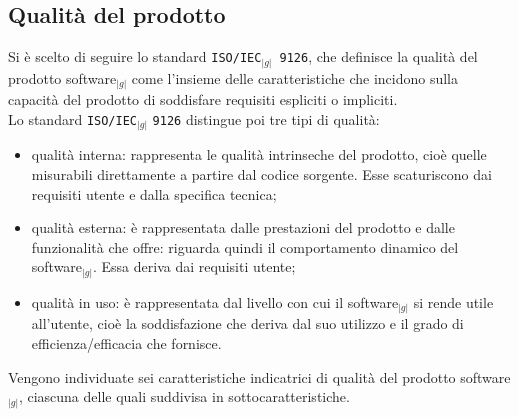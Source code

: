     \subsection{Qualità del prodotto}{
    \label{sec:Qualita2}
	Si è scelto di seguire lo standard \texttt{ISO/IEC$_{|g|}$ 9126}, che definisce la qualità del prodotto software$_{|g|}$ come l’insieme delle 
	caratteristiche che incidono sulla capacità del prodotto di soddisfare requisiti espliciti o impliciti.\\
	Lo standard \texttt{ISO/IEC}$_{|g|}$ \texttt{9126} distingue poi tre tipi di qualità:
	\begin{itemize}
		\item qualità interna: rappresenta le qualità intrinseche del prodotto, cioè quelle misurabili direttamente a partire dal codice sorgente. 
		      Esse scaturiscono dai requisiti utente e dalla specifica tecnica;
		\item qualità esterna: è rappresentata dalle prestazioni del prodotto e dalle funzionalità che offre: riguarda quindi il comportamento 
		      dinamico del software$_{|g|}$. Essa deriva dai requisiti utente;
		\item qualità in uso: è rappresentata dal livello con cui il software$_{|g|}$ si rende utile all’utente, cioè la soddisfazione che 
		      deriva dal suo utilizzo e il grado di efficienza/efficacia che fornisce.
	\end{itemize}
	Vengono individuate sei caratteristiche indicatrici di qualità del prodotto software$_{|g|}$, ciascuna delle quali suddivisa 
	in sottocaratteristiche.

}
